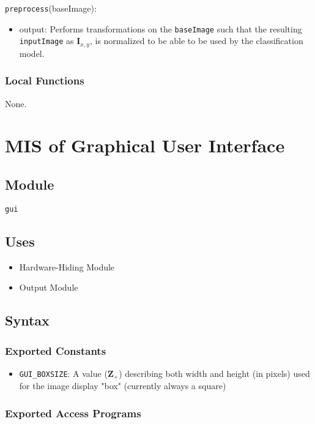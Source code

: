 \documentclass[12pt, titlepage]{article}
\def\code#1{\texttt{#1}}
\begin{document}
\noindent \code{preprocess}(baseImage):
\begin{itemize} 
\item output: Performs transformations on the \code{baseImage} such that the resulting \code{inputImage} 
as $\mathbf{I}_{x,y}$, is normalized to be able to be used by the classification model.
\end{itemize}

\subsubsection{Local Functions}

None.

\section{MIS of Graphical User Interface} \label{ModuleGUI} 

\subsection{Module}

\code{gui}

\subsection{Uses}

\begin{itemize}
  \item Hardware-Hiding Module  
  \item Output Module 
\end{itemize}

\subsection{Syntax}

\subsubsection{Exported Constants}

\begin{itemize}
  \item \code{GUI_BOXSIZE}: A value ($\mathbf{Z}_{+}$) describing both width and height (in pixels) used for the image
  display "box" (currently always a square)
\end{itemize}

\subsubsection{Exported Access Programs}
\end{document}
